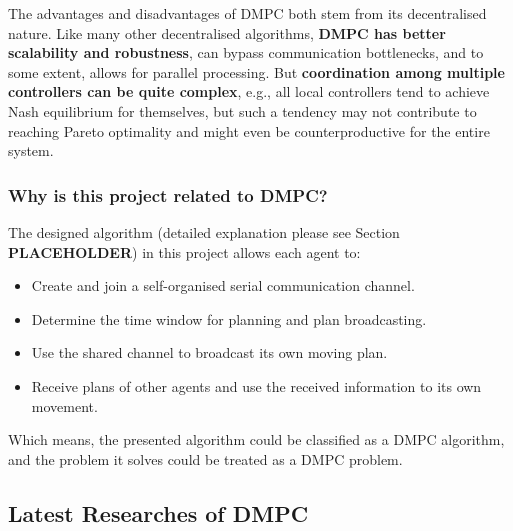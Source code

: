 {The advantages and disadvantages of DMPC both stem from its decentralised nature. 
Like many other decentralised algorithms, \textbf{DMPC has better scalability and robustness}, can bypass communication bottlenecks, and to some extent, allows for parallel processing.
But \textbf{coordination among multiple controllers can be quite complex},
e.g., all local controllers tend to achieve Nash equilibrium for themselves, but such a tendency may not contribute to reaching Pareto optimality and might even be counterproductive for the entire system\cite{Nash_Equi}.

\subsubsection{Why is this project related to DMPC?}

The designed algorithm (detailed explanation please see Section \textbf{PLACEHOLDER}) in this project allows each agent to:
\begin{itemize}
  \item Create and join a self-organised serial communication channel.
  \item Determine the time window for planning and plan broadcasting.
  \item Use the shared channel to broadcast its own moving plan.
  \item Receive plans of other agents and use the received information to its own movement.
\end{itemize}

Which means, the presented algorithm could be classified as a DMPC algorithm, and the problem it solves could be treated as a DMPC problem.

\subsection{Latest Researches of DMPC}
}

